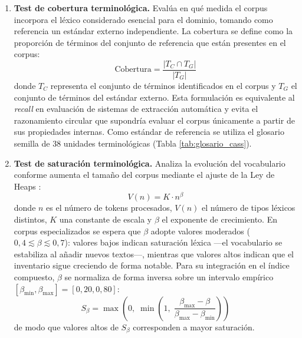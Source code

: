 \begin{enumerate}

    \item \textbf{Test de cobertura terminológica.}
    Evalúa en qué medida el corpus incorpora el léxico considerado esencial
    para el dominio, tomando como referencia un estándar externo independiente.
    La cobertura se define como la proporción de términos del conjunto de
    referencia que están presentes en el corpus:
    \begin{equation}
        \mathrm{Cobertura} = \frac{|T_C \cap T_G|}{|T_G|}
        \label{eq:cobertura}
    \end{equation}
    donde $T_C$ representa el conjunto de términos identificados en el corpus
    y $T_G$ el conjunto de términos del estándar externo. Esta formulación
    es equivalente al \textit{recall} en evaluación de sistemas de extracción
    automática y evita el razonamiento circular que supondría evaluar el corpus
    únicamente a partir de sus propiedades internas. Como estándar de referencia
    se utiliza el glosario semilla de 38 unidades terminológicas (Tabla
    \ref{tab:glosario_cass}).

    \item \textbf{Test de saturación terminológica.}
    Analiza la evolución del vocabulario conforme aumenta el tamaño del corpus
    mediante el ajuste de la Ley de Heaps \autocite{heaps1978information}:
    \begin{equation}
        V(n) = K \cdot n^{\beta}
        \label{eq:heaps}
    \end{equation}
    donde $n$ es el número de tokens procesados, $V(n)$ el número de tipos
    léxicos distintos, $K$ una constante de escala y $\beta$ el exponente de
    crecimiento. En corpus especializados se espera que $\beta$ adopte valores
    moderados ($0{,}4 \lesssim \beta \lesssim 0{,}7$): valores bajos indican
    saturación léxica —el vocabulario se estabiliza al añadir nuevos textos—,
    mientras que valores altos indican que el inventario sigue creciendo de
    forma notable. Para su integración en el índice compuesto, $\beta$ se
    normaliza de forma inversa sobre un intervalo empírico
    $[\beta_{\min}, \beta_{\max}] = [0{,}20, 0{,}80]$:
    \begin{equation}
        S_{\beta} = \max\!\left(0,\;\min\!\left(1,\;
        \frac{\beta_{\max} - \beta}{\beta_{\max} - \beta_{\min}}
        \right)\right)
        \label{eq:norm-beta}
    \end{equation}
    de modo que valores altos de $S_\beta$ corresponden a mayor saturación.


\end{enumerate}
